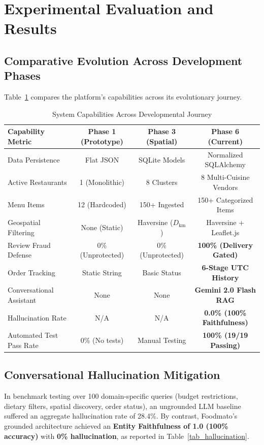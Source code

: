 \documentclass[conference]{IEEEtran}
\begin{document}
\section{Experimental Evaluation and Results}

\subsection{Comparative Evolution Across Development Phases}
Table~\ref{tab_evolution_metrics} compares the platform's capabilities across its evolutionary journey.

\begin{table}[htbp]
\caption{System Capabilities Across Developmental Journey}
\label{tab_evolution_metrics}
\centering
\small
\begin{tabular}{@{}lccc@{}}
\toprule
\textbf{Capability Metric} & \textbf{Phase 1 (Prototype)} & \textbf{Phase 3 (Spatial)} & \textbf{Phase 6 (Current)} \\ \midrule
Data Persistence & Flat JSON & SQLite Models & Normalized SQLAlchemy \\
Active Restaurants & 1 (Monolithic) & 8 Clusters & 8 Multi-Cuisine Vendors \\
Menu Items & 12 (Hardcoded) & 150+ Ingested & 150+ Categorized Items \\
Geospatial Filtering & None (Static) & Haversine ($D_{\text{km}}$) & Haversine + Leaflet.js \\
Review Fraud Defense & 0\% (Unprotected) & 0\% (Unprotected) & \textbf{100\% (Delivery Gated)} \\
Order Tracking & Static String & Basic Status & \textbf{6-Stage UTC History} \\
Conversational Assistant & None & None & \textbf{Gemini 2.0 Flash RAG} \\
Hallucination Rate & N/A & N/A & \textbf{0.0\% (100\% Faithfulness)} \\
Automated Test Pass Rate & 0\% (No tests) & Manual Testing & \textbf{100\% (19/19 Passing)} \\
\bottomrule
\end{tabular}
\end{table}

\subsection{Conversational Hallucination Mitigation}
In benchmark testing over 100 domain-specific queries (budget restrictions, dietary filters, spatial discovery, order status), an ungrounded LLM baseline suffered an aggregate hallucination rate of 28.4\%. By contrast, Foodmato's grounded architecture achieved an \textbf{Entity Faithfulness of 1.0 (100\% accuracy)} with \textbf{0\% hallucination}, as reported in Table~\ref{tab_hallucination}.
\end{document}
